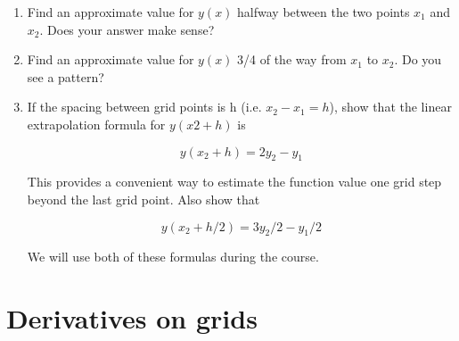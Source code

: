      \begin{enumerate}[label=(\alph*)]
     
     	\item Find an approximate value for $y(x)$ halfway between the two points $x_1$ and $x_2$. Does your answer make sense?
     	
     	\item Find an approximate value for $y(x)$ 3/4 of the way from $x_1$ to $x_2$. Do you see a pattern?
     	
     
     	\item If the spacing between grid points is h (i.e. $x_2 − x_1 = h$), show that the linear extrapolation formula for $y(x2+h)$ is
     	
     	\begin{equation} \label{eq:2}
     		y(x_2 + h) = 2y_2 - y_1
     	\end{equation}
     	
     	This provides a convenient way to estimate the function value one grid step beyond the last grid point. Also show that
     	
     	\begin{equation} \label{eq:3}
     		y(x_2 + h/2) = 3y_2/2 - y_1/2
     	\end{equation}
     	
     	We will use both of these formulas during the course.
     	
     \end{enumerate}
     \section*{Derivatives on grids}
     
